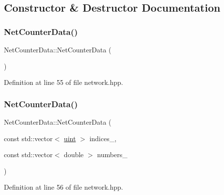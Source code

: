 \subsection{Constructor \& Destructor Documentation}
\mbox{\label{class_net_counter_data_ac3a5083286ad4fad43e6b6d5db1f7caa}} 
\subsubsection{\texorpdfstring{Net\+Counter\+Data()}{NetCounterData()}\hspace{0.1cm}{\footnotesize\ttfamily [1/2]}}
{\footnotesize\ttfamily Net\+Counter\+Data\+::\+Net\+Counter\+Data (\begin{DoxyParamCaption}{ }\end{DoxyParamCaption})\hspace{0.3cm}{\ttfamily [inline]}}



Definition at line 55 of file network.\+hpp.

\mbox{\label{class_net_counter_data_ac816e1f8892a4d6f500df387309c1b1b}} 
\subsubsection{\texorpdfstring{Net\+Counter\+Data()}{NetCounterData()}\hspace{0.1cm}{\footnotesize\ttfamily [2/2]}}
{\footnotesize\ttfamily Net\+Counter\+Data\+::\+Net\+Counter\+Data (\begin{DoxyParamCaption}\item[{const std\+::vector$<$ \hyperlink{typedefs_8hpp_a91ad9478d81a7aaf2593e8d9c3d06a14}{uint} $>$}]{indices\+\_\+,  }\item[{const std\+::vector$<$ double $>$}]{numbers\+\_\+ }\end{DoxyParamCaption})\hspace{0.3cm}{\ttfamily [inline]}}



Definition at line 56 of file network.\+hpp.

